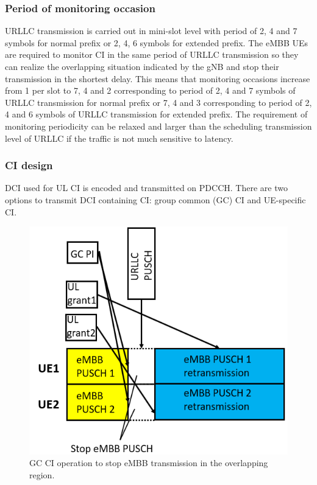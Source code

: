 \documentclass{ieeeaccess}
\begin{document}
\subsubsection{Period of monitoring occasion}
URLLC transmission is carried out in mini-slot level with period of 2, 4 and 7 symbols for normal prefix or 2, 4, 6 symbols for extended prefix. The eMBB UEs are required to monitor CI in the same period of URLLC transmission so they can realize the overlapping situation indicated by the gNB and stop their transmission in the shortest delay. This means that monitoring occasions increase from 1 per slot to 7, 4 and 2 corresponding to period of 2, 4 and 7 symbols of URLLC transmission for normal prefix or 7, 4 and 3 corresponding to period of 2, 4 and 6 symbols of URLLC transmission for extended prefix. The requirement of monitoring periodicity can be relaxed and larger than the scheduling transmission level of URLLC if the traffic is not much sensitive to latency. 

\subsubsection {CI design}

DCI used for UL CI is encoded and transmitted on PDCCH. There are two options to transmit DCI containing CI: group common (GC) CI and UE-specific CI.

\begin{figure}[htbp]
\centerline{\includegraphics[scale=0.38]{fig10.PNG}}
\caption{GC CI operation to stop eMBB transmission in the overlapping region.}
\label{fig10}
\vspace{-2mm}
\end{figure}
\end{document}
